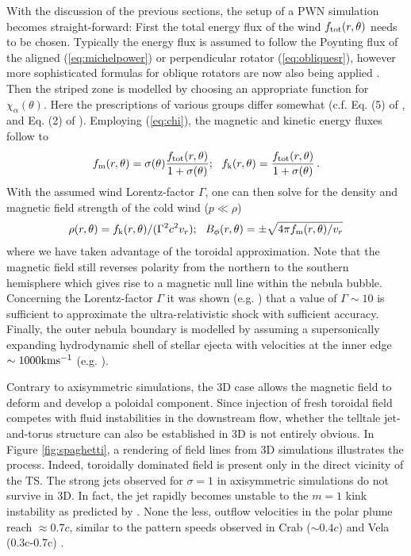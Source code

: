 With the discussion of the previous sections, the setup of a PWN simulation becomes straight-forward:  
First the total energy flux of the wind $f_{\rm tot}(r,\theta)$ needs to be chosen. Typically the energy flux is assumed to follow the Poynting flux of the aligned (\ref{eq:michelpower}) or perpendicular rotator (\ref{eq:obliquesr}), however more sophisticated formulas for oblique rotators are now also being applied \citep[see][]{BuhlerGiomi2016}.  
Then the striped zone is modelled by choosing an appropriate function for $\chi_\alpha(\theta)$.  Here the prescriptions of various groups differ somewhat (c.f. Eq. (5) of \cite{PorthKomissarov2013}, and Eq. (2) of \cite{2014MNRAS.438.1518O}).  Employing (\ref{eq:chi}), the magnetic and kinetic energy fluxes follow to
\begin{align}
	f_{\rm m}(r,\theta) = \sigma(\theta)\frac{f_{\rm tot}(r,\theta)}{1+\sigma(\theta)};\ \ f_{\rm k}(r,\theta) = \frac{f_{\rm tot}(r,\theta)}{1+\sigma(\theta)}\, .
\end{align}
With the assumed wind Lorentz-factor $\Gamma$, one can then solve for the density and magnetic field strength of the cold wind ($p\ll\rho$) 
\begin{align}
\rho(r,\theta) = f_{\rm k}(r,\theta)/(\Gamma^2c^2v_{r});\ \ B_{\phi}(r,\theta)=\pm\sqrt{4\pi f_{\rm m}(r,\theta)/v_r}
\end{align}
where we have taken advantage of the toroidal approximation.  Note that the magnetic field still reverses polarity from the northern to the southern hemisphere which gives rise to a magnetic null line within the nebula bubble.  Concerning the Lorentz-factor $\Gamma$ it was shown (e.g. \cite{komissarov2004}) that a value of $\Gamma\sim10$ is sufficient to approximate the ultra-relativistic shock with sufficient accuracy.  
Finally, the outer nebula boundary is modelled by assuming a supersonically expanding hydrodynamic shell of stellar ejecta with velocities at the inner edge $\sim1000\rm km s^{-1}$ (e.g. \cite{del-zanna2004}).  

Contrary to axisymmetric simulations, the 3D case allows the magnetic field to deform and develop a poloidal component.  Since injection of fresh toroidal field competes with fluid instabilities in the downstream flow, whether the telltale jet-and-torus structure can also be established in 3D is not entirely obvious.  
In Figure \ref{fig:spaghetti}, a rendering of field lines from 3D simulations illustrates the process.  Indeed, toroidally dominated field is present only in the direct vicinity of the TS.  
The strong jets observed for $\sigma=1$ in axisymmetric simulations do not survive in 3D. In fact, the jet rapidly becomes unstable to the $m=1$ kink instability as predicted by \cite{begelman1998}.  None the less, outflow velocities in the polar plume reach $\approx0.7c$, similar to the pattern speeds observed in Crab ($\sim 0.4c$) \citep{hester2002} and Vela (0.3c-0.7c) \citep{PavlovTeter2003}.  

